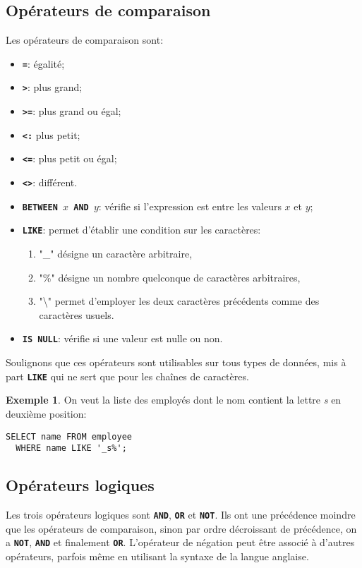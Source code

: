 \documentclass[a4paper, 12pt]{report}
\newcommand{\textSQL}[1]{\texttt{\textbf{#1}}}
\theoremstyle{definition} \newtheorem{ex}{Exemple}
\begin{document}
\subsection{Opérateurs de comparaison}
Les opérateurs de comparaison sont:
\begin{itemize}
	\item \textSQL{=}: égalité;
	\item \textSQL{>}: plus grand;
	\item \textSQL{>=}: plus grand ou égal;
	\item \textSQL{<:} plus petit;
	\item \textSQL{<=}: plus petit ou égal;
	\item \textSQL{<>}: différent.
	\item \textSQL{BETWEEN $x$ AND $y$}: vérifie si l'expression est entre les valeurs $x$ et $y$;
	\item \textSQL{LIKE}: permet d'établir une condition sur les caractères:
	\begin{enumerate}
		\item "\_" désigne un caractère arbitraire,
		\item "\%" désigne un nombre quelconque de caractères arbitraires,
		\item"\textbackslash{}" permet d'employer les deux caractères précédents comme des caractères usuels.
	\end{enumerate}
	\item \textSQL{IS NULL}: vérifie si une valeur est nulle ou non.
\end{itemize}

Soulignons que ces opérateurs sont utilisables sur tous types de données, mis à part \textSQL{LIKE} qui ne sert que pour les chaînes de caractères.
\begin{ex}
 On veut la liste des employés dont le nom contient la lettre \emph{s} en deuxième position:

\begin{lstlisting}[frame=single]
SELECT name FROM employee
  WHERE name LIKE '_s%';
\end{lstlisting}
\end{ex}
\subsection{Opérateurs logiques}
Les trois opérateurs logiques sont \textSQL{AND}, \textSQL{OR} et \textSQL{NOT}. Ils ont une précédence moindre que les opérateurs de comparaison, sinon par ordre décroissant de précédence, on a \textSQL{NOT}, \textSQL{AND} et finalement \textSQL{OR}. L'opérateur de négation peut être associé à d'autres opérateurs, parfois même en utilisant  la syntaxe de la langue anglaise.
\end{document}
